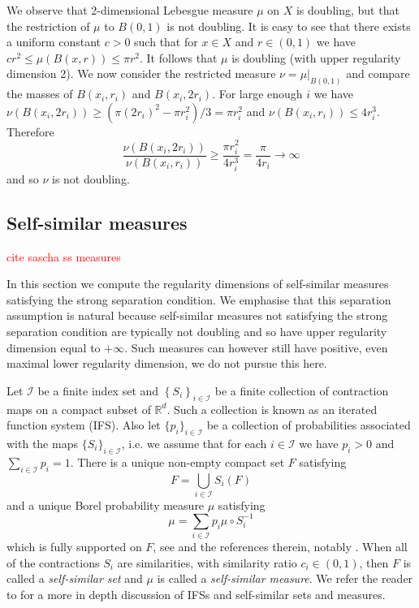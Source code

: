 We observe  that 2-dimensional Lebesgue measure $\mu$ on $X$ is doubling, but that the restriction of $\mu$ to $B(0,1)$ is not doubling.  It is easy to see that there exists a uniform constant $c>0$ such that for $x \in X$ and $r\in (0,1)$ we have $cr^2 \leq \mu(B(x,r)) \leq \pi r^2$.  It follows that $\mu$ is doubling (with upper regularity dimension 2).  We now consider the restricted measure $\nu = \mu \vert_{B(0,1)}$ and compare the masses of $B(x_i,r_i)$ and $B(x_i,2r_i)$. For large enough $i$ we have $\nu (B(x_i,2r_i)) \ge (\pi (2r_i)^2-\pi r_i^2)/3 = \pi r_i^2$  and $\nu (B(x_i,r_i)) \le 4 r_i^3$. Therefore
\[
\frac{\nu(B(x_i,2r_i))}{\nu(B(x_i,r_i))} \ge \frac{\pi r_i^2}{4r_i^3} =  \frac{\pi}{4r_i} \to \infty
\]
and so  $\nu$ is not doubling.


\subsection{Self-similar measures}\label{ch-upper-reg:self-similarresult}

\textcolor{red}{cite sascha ss measures}

In this section we compute the regularity dimensions of self-similar measures satisfying the strong separation condition.  We emphasise that this separation assumption is natural because self-similar measures not satisfying the strong separation condition are typically not doubling and so have upper regularity dimension equal to $+\infty$. Such measures can however still have positive, even maximal lower regularity dimension, we do not pursue this here.

Let  $\mathcal{I}$ be a finite index set and $\left\{S_i \right\}_{i \in \mathcal{I}}$ be a finite collection of  contraction maps on a compact subset of $\mathbb{R}^d$.  Such a collection is known as an iterated function system (IFS).  Also let $\{p_i\}_{i \in \mathcal{I}}$ be a collection of probabilities associated with the maps $\{S_i\}_{i \in \mathcal{I}}$, i.e. we assume that for each $i \in \mathcal{I}$ we have $p_i>0$ and $\sum_{i \in \mathcal{I}} p_i = 1$. There is a  unique non-empty compact set $F$ satisfying 
\[
F=\displaystyle\bigcup_{i\in \mathcal{I}} S_i(F)
\]
and  a unique Borel probability measure $\mu$ satisfying
\[
\mu = \sum_{i \in \mathcal{I}} p_i \mu \circ S_i^{-1}
\]
which is fully supported on $F$, see \cite[Chapter 9]{falconer} and the references therein, notably \cite{hutchinson}. When all of the contractions $S_i$ are similarities, with similarity ratio $c_i \in \left(0,1 \right)$, then $F$ is called a \emph{self-similar set} and $\mu$ is called a \emph{self-similar measure}.  We refer the reader to \cite{falconer} for a more in depth discussion of IFSs and self-similar sets and measures.

